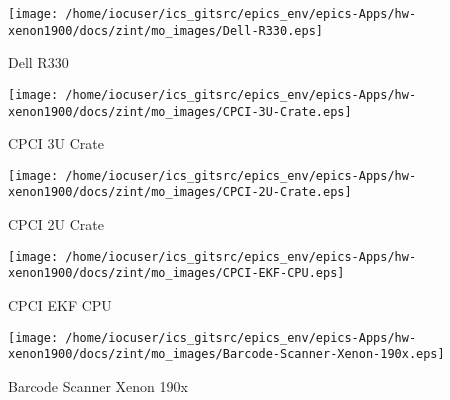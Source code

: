 \noindent
\vspace{1.4cm}
\begin{minipage}{.2\textwidth}
\begin{center}
\texttt{[image: /home/iocuser/ics\_gitsrc/epics\_env/epics-Apps/hw-xenon1900/docs/zint/mo\_images/Dell-R330.eps]}
\end{center}
\end{minipage}
\begin{minipage}{.7\textwidth}
Dell R330
\end{minipage}


\noindent
\vspace{1.4cm}
\begin{minipage}{.2\textwidth}
\begin{center}
\texttt{[image: /home/iocuser/ics\_gitsrc/epics\_env/epics-Apps/hw-xenon1900/docs/zint/mo\_images/CPCI-3U-Crate.eps]}
\end{center}
\end{minipage}
\begin{minipage}{.7\textwidth}
CPCI 3U Crate
\end{minipage}


\noindent
\vspace{1.4cm}
\begin{minipage}{.2\textwidth}
\begin{center}
\texttt{[image: /home/iocuser/ics\_gitsrc/epics\_env/epics-Apps/hw-xenon1900/docs/zint/mo\_images/CPCI-2U-Crate.eps]}
\end{center}
\end{minipage}
\begin{minipage}{.7\textwidth}
CPCI 2U Crate
\end{minipage}


\noindent
\vspace{1.4cm}
\begin{minipage}{.2\textwidth}
\begin{center}
\texttt{[image: /home/iocuser/ics\_gitsrc/epics\_env/epics-Apps/hw-xenon1900/docs/zint/mo\_images/CPCI-EKF-CPU.eps]}
\end{center}
\end{minipage}
\begin{minipage}{.7\textwidth}
CPCI EKF CPU 
\end{minipage}


\noindent
\vspace{1.4cm}
\begin{minipage}{.2\textwidth}
\begin{center}
\texttt{[image: /home/iocuser/ics\_gitsrc/epics\_env/epics-Apps/hw-xenon1900/docs/zint/mo\_images/Barcode-Scanner-Xenon-190x.eps]}
\end{center}
\end{minipage}
\begin{minipage}{.7\textwidth}
Barcode Scanner Xenon 190x
\end{minipage}


